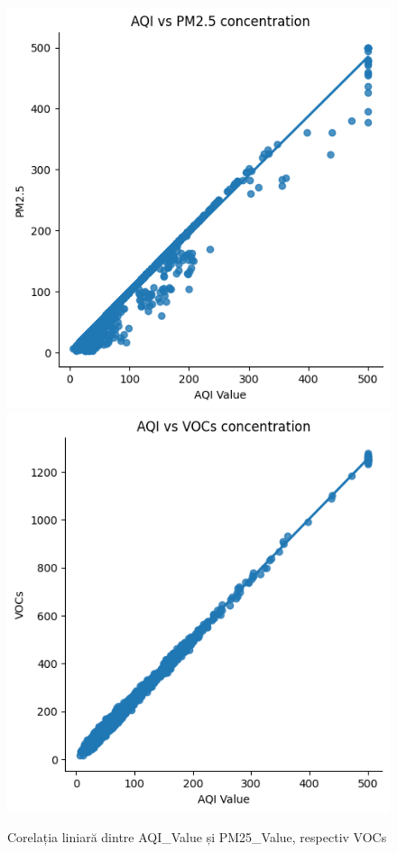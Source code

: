 \documentclass{article}
\begin{document}
\begin{figure}[ht]
    \centering
    \includegraphics[scale=0.5]{images/air_pollution/correlation/aqi_pm25.png}
    \includegraphics[scale=0.5]{images/air_pollution/correlation/aqi_vocs.png}
    \caption{Corelația liniară dintre AQI\_Value și PM25\_Value, respectiv VOCs}
    \label{fig:pol:corr_graphs}
\end{figure}
\end{document}
